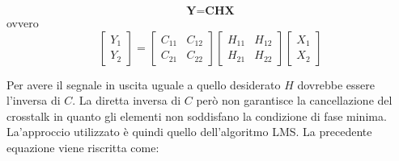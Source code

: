\documentclass[12pt,a4paper,titlepage]{article}
\begin{document}
\begin{equation}
\textbf{Y=CHX}
\end{equation}
ovvero
\begin{equation}
\begin{bmatrix}
Y_1\\
Y_2
\end{bmatrix}
=
\begin{bmatrix}
C_{11} & C_{12}\\
C_{21} & C_{22}
\end{bmatrix}
\begin{bmatrix}
H_{11} & H_{12}\\
H_{21} & H_{22}
\end{bmatrix}
\begin{bmatrix}
X_1\\
X_2
\end{bmatrix}
\end{equation}

Per avere il segnale in uscita uguale a quello desiderato $H$ dovrebbe essere l'inversa di $C$. La diretta inversa di $C$ però non garantisce la cancellazione del crosstalk in quanto gli elementi non soddisfano la condizione di fase minima.
La'approccio utilizzato è quindi quello dell'algoritmo LMS.
La precedente equazione viene riscritta come:
\end{document}
